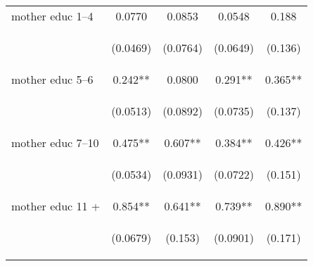\documentclass{article}[11pt,subeqn]
\begin{document}
\begin{spacing}{1.5}
\begin{table}[htpb!]
\begin{center}
\begin{tabular}{lcccc}
mother educ 1--4 & 0.0770 & 0.0853 & 0.0548 & 0.188 \\
\vspace{4pt} & \begin{footnotesize}(0.0469)\end{footnotesize} & \begin{footnotesize}(0.0764)\end{footnotesize} & \begin{footnotesize}(0.0649)\end{footnotesize} & \begin{footnotesize}(0.136)\end{footnotesize} \\
mother educ 5--6 & 0.242** & 0.0800 & 0.291** & 0.365** \\
\vspace{4pt} & \begin{footnotesize}(0.0513)\end{footnotesize} & \begin{footnotesize}(0.0892)\end{footnotesize} & \begin{footnotesize}(0.0735)\end{footnotesize} & \begin{footnotesize}(0.137)\end{footnotesize} \\
mother educ 7--10 & 0.475** & 0.607** & 0.384** & 0.426** \\
\vspace{4pt} & \begin{footnotesize}(0.0534)\end{footnotesize} & \begin{footnotesize}(0.0931)\end{footnotesize} & \begin{footnotesize}(0.0722)\end{footnotesize} & \begin{footnotesize}(0.151)\end{footnotesize} \\
mother educ 11 + & 0.854** & 0.641** & 0.739** & 0.890** \\
\vspace{4pt} & \begin{footnotesize}(0.0679)\end{footnotesize} & \begin{footnotesize}(0.153)\end{footnotesize} & \begin{footnotesize}(0.0901)\end{footnotesize} & \begin{footnotesize}(0.171)\end{footnotesize} \\

\end{tabular}
\end{center}
\end{table}
\end{spacing}
\end{document}
